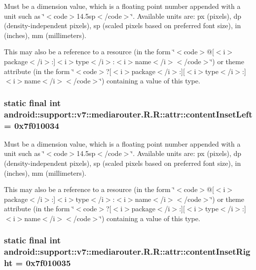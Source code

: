 Must be a dimension value, which is a floating point number appended with a unit such as \char`\"{}$<$code$>$14.5sp$<$/code$>$\char`\"{}. Available units are: px (pixels), dp (density-independent pixels), sp (scaled pixels based on preferred font size), in (inches), mm (millimeters). 

This may also be a reference to a resource (in the form \char`\"{}$<$code$>$@\mbox{[}$<$i$>$package$<$/i$>$:\mbox{]}$<$i$>$type$<$/i$>$:$<$i$>$name$<$/i$>$$<$/code$>$\char`\"{}) or theme attribute (in the form \char`\"{}$<$code$>$?\mbox{[}$<$i$>$package$<$/i$>$:\mbox{]}\mbox{[}$<$i$>$type$<$/i$>$:\mbox{]}$<$i$>$name$<$/i$>$$<$/code$>$\char`\"{}) containing a value of this type. \hypertarget{classandroid_1_1support_1_1v7_1_1mediarouter_1_1_r_1_1attr_94e5d40f2f7b9bbccf8b0e91d2a5e53f}{
\subsubsection[{contentInsetLeft}]{\setlength{\rightskip}{0pt plus 5cm}static final int android::support::v7::mediarouter.R.R::attr::contentInsetLeft = 0x7f010034}}
\label{classandroid_1_1support_1_1v7_1_1mediarouter_1_1_r_1_1attr_94e5d40f2f7b9bbccf8b0e91d2a5e53f}


Must be a dimension value, which is a floating point number appended with a unit such as \char`\"{}$<$code$>$14.5sp$<$/code$>$\char`\"{}. Available units are: px (pixels), dp (density-independent pixels), sp (scaled pixels based on preferred font size), in (inches), mm (millimeters). 

This may also be a reference to a resource (in the form \char`\"{}$<$code$>$@\mbox{[}$<$i$>$package$<$/i$>$:\mbox{]}$<$i$>$type$<$/i$>$:$<$i$>$name$<$/i$>$$<$/code$>$\char`\"{}) or theme attribute (in the form \char`\"{}$<$code$>$?\mbox{[}$<$i$>$package$<$/i$>$:\mbox{]}\mbox{[}$<$i$>$type$<$/i$>$:\mbox{]}$<$i$>$name$<$/i$>$$<$/code$>$\char`\"{}) containing a value of this type. \hypertarget{classandroid_1_1support_1_1v7_1_1mediarouter_1_1_r_1_1attr_85c4ba124ba2d0aec830c009d2e7b075}{
\subsubsection[{contentInsetRight}]{\setlength{\rightskip}{0pt plus 5cm}static final int android::support::v7::mediarouter.R.R::attr::contentInsetRight = 0x7f010035}}
\label{classandroid_1_1support_1_1v7_1_1mediarouter_1_1_r_1_1attr_85c4ba124ba2d0aec830c009d2e7b075}


